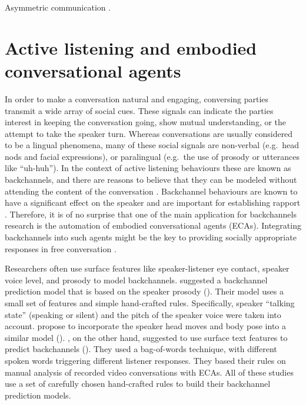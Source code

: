 \documentclass[]{simple-thesis}
\begin{document}
Asymmetric communication \citep{Chou2016, Yee2007, Dominguez2014}.

\section{Active listening and embodied conversational agents}

In order to make a conversation natural and engaging, conversing parties transmit a wide array of social cues.
These signals can indicate the parties interest in keeping the conversation going, show mutual understanding, or the attempt to take the speaker turn.
Whereas conversations are usually considered to be a lingual phenomena, many of these social signals are non-verbal (e.g.\ head nods and facial expressions), or paralingual (e.g.\ the use of prosody or utterances like ``uh-huh'').
In the context of active listening behaviours these are known as backchannels, and there are reasons to believe that they can be modeled without attending the content of the conversation \citep{Yngve1970}.
Backchannel behaviours are known to have a significant effect on the speaker \citep{Bavelas2000} and are important for establishing rapport \citep{Gratch2007}.
Therefore, it is of no surprise that one of the main application for backchannels research is the automation of embodied conversational agents (ECAs).
Integrating backchannels into such agents might be the key to providing socially appropriate responses in free conversation \citep{Morency2008, Bevacqua2008}.

Researchers often use surface features like speaker-listener eye contact, speaker voice level, and prosody to model backchannels.
\citeauthor{Ward2000} suggested a backchannel prediction model that is based on the speaker prosody (\citeyear{Ward2000}).
Their model uses a small set of features and simple hand-crafted rules.
Specifically, speaker ``talking state'' (speaking or silent) and the pitch of the speaker voice were taken into account.
\citeauthor{Gratch2006} propose to incorporate the speaker head moves and body pose into a similar model (\citeyear{Gratch2006}).
\citeauthor{Lee2006}, on the other hand, suggested to use surface text features to predict backchannels (\citeyear{Lee2006}).
They used a bag-of-words technique, with different spoken words triggering different listener responses.
They based their rules on manual analysis of recorded video conversations with ECAs.
All of these studies use a set of carefully chosen hand-crafted rules to build their backchannel prediction models.
\end{document}
